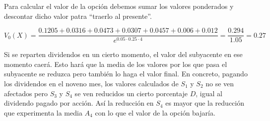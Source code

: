 \begin{problem}[1]
Para calcular el valor de la opción debemos sumar los valores ponderados y descontar dicho valor patra ``traerlo al presente''.

\[V_0(X) = \frac{0.1205 + 0.0316+0.0473 + 0.0307 + 0.0457 + 0.006 + 0.012}{e^{0.05\cdot 0.25\cdot 4}}=\frac{0.294}{1.05}=0.27\]

\spart

Si se reparten dividendos en un cierto momento, el valor del subyacente en ese momento caerá. Esto hará que la media de los valores por los que pasa el subyacente se reduzca pero también lo haga el valor final. En concreto, pagando los dividendos en el noveno mes, los valores calculados de $S_1$ y $S_2$ no se ven afectados pero $S_3$ y $S_4$ se ven reducidos un cierto porcentaje $D$, igual al dividendo pagado por acción. Así la reducción en $S_4$ es mayor que la reducción que experimenta la media $A_4$ con lo que el valor de la opción bajaría.
\end{problem}


